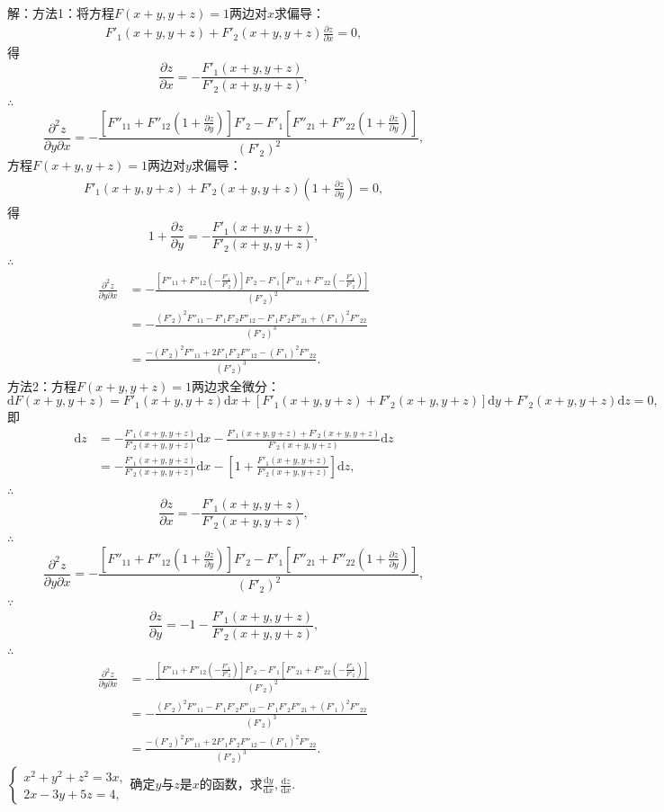 \documentclass[12pt,UTF8]{ctexart}
\begin{document}
\begin{enumerate}
解：方法1：将方程$F(x+y,y+z)=1$两边对$x$求偏导：
\[\begin{split}
F'_1(x+y,y+z)+F'_2(x+y,y+z)\frac{\partial z}{\partial x}=0,
\end{split}\]
得
\[
\frac{\partial z}{\partial x}=-\frac{F'_1(x+y,y+z)}{F'_2(x+y,y+z)},
\]
$\therefore$
\[
\frac{\partial^2z}{\partial y\partial x}=-\frac{[F''_{11}+F''_{12}(1+\frac{\partial z}{\partial y})]F'_2-F'_1[F''_{21}+F''_{22}(1+\frac{\partial z}{\partial y})]}{(F'_2)^2},
\]
方程$F(x+y,y+z)=1$两边对$y$求偏导：
\[\begin{split}
F'_1(x+y,y+z)+F'_2(x+y,y+z)(1+\frac{\partial z}{\partial y})=0,
\end{split}\]
得
\[
1+\frac{\partial z}{\partial y}=-\frac{F'_1(x+y,y+z)}{F'_2(x+y,y+z)},
\]
$\therefore$
\[\begin{split}
\frac{\partial^2z}{\partial y\partial x}&=-\frac{[F''_{11}+F''_{12}(-\frac{F'_1}{F'_2})]F'_2-F'_1[F''_{21}+F''_{22}(-\frac{F'_1}{F'_2})]}{(F'_2)^2}\\
&=-\frac{(F'_2)^2F''_{11}-F'_1F'_2F''_{12}-F'_1F'_2F''_{21}+(F'_1)^2F''_{22}}{(F'_2)^3}\\
&=\frac{-(F'_2)^2F''_{11}+2F'_1F'_2F''_{12}-(F'_1)^2F''_{22}}{(F'_2)^3}.
\end{split}\]
方法2：方程$F(x+y,y+z)=1$两边求全微分：
\[
\mathrm dF(x+y,y+z)=F'_1(x+y,y+z)\mathrm dx+[F'_1(x+y,y+z)+F'_2(x+y,y+z)]\mathrm dy+F'_2(x+y,y+z)\mathrm dz=0,
\]
即
\[\begin{split}
\mathrm dz&=-\frac{F'_1(x+y,y+z)}{F'_2(x+y,y+z)}\mathrm dx-\frac{F'_1(x+y,y+z)+F'_2(x+y,y+z)}{F'_2(x+y,y+z)}\mathrm dz\\
&=-\frac{F'_1(x+y,y+z)}{F'_2(x+y,y+z)}\mathrm dx-[1+\frac{F'_1(x+y,y+z)}{F'_2(x+y,y+z)}]\mathrm dz,
\end{split}\]
$\therefore$
\[
\frac{\partial z}{\partial x}=-\frac{F'_1(x+y,y+z)}{F'_2(x+y,y+z)},
\]
$\therefore$
\[
\frac{\partial^2z}{\partial y\partial x}=-\frac{[F''_{11}+F''_{12}(1+\frac{\partial z}{\partial y})]F'_2-F'_1[F''_{21}+F''_{22}(1+\frac{\partial z}{\partial y})]}{(F'_2)^2},
\]
$\because$
\[
\frac{\partial z}{\partial y}=-1-\frac{F'_1(x+y,y+z)}{F'_2(x+y,y+z)},
\]
$\therefore$
\[\begin{split}
\frac{\partial^2z}{\partial y\partial x}&=-\frac{[F''_{11}+F''_{12}(-\frac{F'_1}{F'_2})]F'_2-F'_1[F''_{21}+F''_{22}(-\frac{F'_1}{F'_2})]}{(F'_2)^2}\\
&=-\frac{(F'_2)^2F''_{11}-F'_1F'_2F''_{12}-F'_1F'_2F''_{21}+(F'_1)^2F''_{22}}{(F'_2)^3}\\
&=\frac{-(F'_2)^2F''_{11}+2F'_1F'_2F''_{12}-(F'_1)^2F''_{22}}{(F'_2)^3}.
\end{split}\]
$\begin{cases}
x^2+y^2+z^2=3x,\\
2x-3y+5z=4,
\end{cases}$确定$y$与$z$是$x$的函数，求$\frac{\mathrm dy}{\mathrm dx},\frac{\mathrm dz}{\mathrm dx}$.


\end{enumerate}
\end{document}
